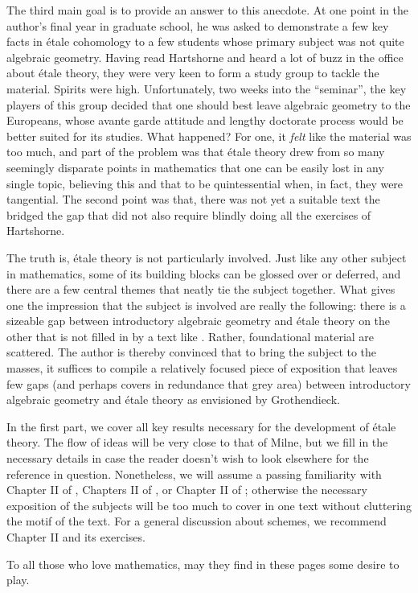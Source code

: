 The third main goal is to provide an answer to this anecdote. At 
one point in the author's final year in graduate school, he was 
asked to demonstrate a few key facts in \'etale cohomology to a 
few students whose primary subject was not quite algebraic 
geometry. Having read Hartshorne and heard a lot of buzz in the 
office about \'etale theory, they were very keen to form a study 
group to tackle the material. Spirits were high. Unfortunately,
two weeks into the ``seminar'', the key players of this group 
decided that one should best leave algebraic geometry to the 
Europeans, whose avante garde attitude and lengthy doctorate 
process would be better suited for its studies. What happened? 
For one, it \emph{felt} like the material was too much, and part 
of the problem was that \'etale theory drew from so many seemingly 
disparate points in mathematics that one can be easily lost in any 
single topic, believing this and that to be quintessential when, 
in fact, they were tangential. The second point was that, there 
was not yet a suitable text the bridged the gap that did not also 
require blindly doing all the exercises of Hartshorne.

The truth is, \'etale theory is not particularly involved. Just
like any other subject in mathematics, some of its building blocks 
can be glossed over or deferred, and there are a few central 
themes that neatly tie the subject together. What gives one the 
impression that the subject is involved are really the following: 
there is a sizeable gap between introductory algebraic geometry 
and \'etale theory on the other that is not filled in by a text 
like \cite{Milne}. Rather, foundational material are scattered. 
The author is thereby convinced that to bring the subject to the 
masses, it suffices to compile a relatively focused piece of 
exposition that leaves few gaps (and perhaps covers in redundance 
that grey area) between introductory algebraic geometry and 
\'etale theory as envisioned by Grothendieck.

In the first part, we cover all key results necessary for the 
development of \'etale theory. The flow of ideas will be very 
close to that of Milne, but we fill in the necessary details in 
case the reader doesn't wish to look elsewhere for the reference 
in question. Nonetheless, we will assume a passing familiarity 
with Chapter II of \cite{Hart}, Chapters II of \cite{Liu}, or 
Chapter II of \cite{Mum}; otherwise the necessary exposition of 
the subjects will be too much to cover in one text without 
cluttering the motif of the text. For a general discussion about 
schemes, we recommend \cite{Hart} Chapter II and its exercises.



To all those who love mathematics, may they find in these pages 
some desire to play.
